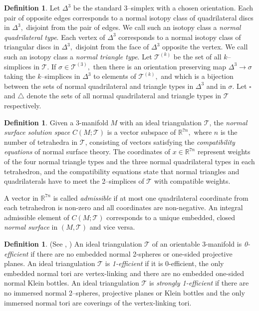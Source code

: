 \documentclass[12pt]{amsart}
\theoremstyle{definition}
\newtheorem{defn}[thm]{Definition}
\theoremstyle{remark}
\def\tri{\mathcal{T}}
\begin{document}
\begin{defn}
Let $\Delta^3$ be the standard 3--simplex with a chosen orientation. Each pair of opposite edges corresponds to a normal isotopy class of quadrilateral discs in $\Delta^3,$ disjoint from the pair of edges. We call such an isotopy class a \emph{normal quadrilateral type}. Each vertex of $\Delta^3$ corresponds to a normal isotopy class of triangular discs in $\Delta^3,$ disjoint from the face of $\Delta^3$ opposite the vertex. We call such an isotopy class a \emph{normal triangle type}. Let $\tri^{(k)}$ be the set of all $k$--simplices in $\tri$. If $\sigma \in \tri^{(3)},$ then there is an orientation preserving map $\Delta^3 \to \sigma$ taking the $k$--simplices in $\Delta^3$ to elements of $\tri^{(k)},$ and which is a bijection between the sets of normal quadrilateral and triangle types in $\Delta^3$ and in $\sigma$. 
Let $\square$ and $\triangle$ denote the sets of all normal quadrilateral and triangle types in $\tri$ respectively.
\end{defn}

\begin{defn}
Given a $3$-manifold $M$ with an ideal triangulation $\tri$,
the \emph{normal surface solution space}  $C(M; \tri)$ is a vector subspace of $\mathbb{R}^{7n},$ where $n$ is the number of tetrahedra in $\tri$, consisting of vectors  satisfying the \emph{compatibility equations} of normal surface theory. The coordinates of $x \in \mathbb{R}^{7n}$ represent weights of the four normal triangle types and the three normal quadrilateral types in each tetrahedron, and the compatibility equations state that normal triangles and quadrilaterals have to meet the 2--simplices of $\tri$ with compatible weights. 

A vector in $\mathbb{R}^{7n}$ is called \emph{admissible} if at most one quadrilateral coordinate from each tetrahedron is non-zero and all coordinates are non-negative. An integral admissible element of $C(M; \tri)$ corresponds to a unique embedded, closed \emph{normal surface} in $(M,\tri)$ and vice versa.
\end{defn}

\begin{defn} (See \cite{JR}, \cite{KR2})
An ideal triangulation $\tri$ of an orientable $3$-manifold is \emph{0-efficient} if there are no embedded normal 2-spheres or one-sided projective planes. An ideal triangulation $\tri$ is \emph{1-efficient} if it is 0-efficient, the only embedded normal tori are vertex-linking and there are no embedded one-sided normal Klein bottles. An ideal triangulation $\tri$ is \emph{strongly 1-efficient} if there are no immersed normal 2--spheres, projective planes or Klein bottles and the only immersed normal tori are coverings of the vertex-linking tori.
\end{defn}
\end{document}
